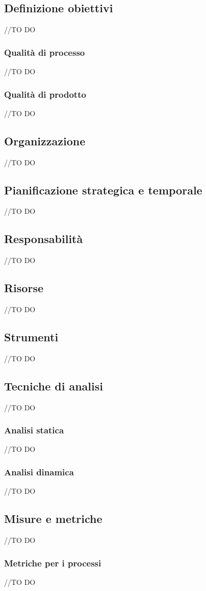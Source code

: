 \documentclass[12pt,a4paper]{article}
\begin{document}
\subsection{Definizione obiettivi}
//TO DO
\subsubsection{Qualità di processo}
//TO DO
\subsubsection{Qualità di prodotto}
//TO DO
\subsection{Organizzazione}
//TO DO
\subsection{Pianificazione strategica e temporale}
//TO DO
\subsection{Responsabilità}
//TO DO
\subsection{Risorse}
//TO DO
\subsection{Strumenti}
//TO DO
\subsection{Tecniche di analisi}
//TO DO
\subsubsection{Analisi statica}
//TO DO
\subsubsection{ Analisi dinamica}
//TO DO
\subsection{Misure e metriche}
//TO DO
\subsubsection{Metriche per i processi}
//TO DO
\end{document}
